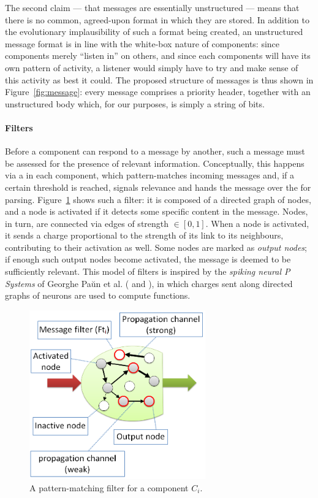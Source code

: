 The second claim --- that messages are essentially unstructured --- means that there is no common, agreed-upon format in which they are stored. In addition to the evolutionary implausibility of such a format being created, an unstructured message format is in line with the white-box nature of components: since components merely ``listen in'' on others, and since each components will have its own pattern of activity, a listener would simply have to try and make sense of this activity as best it could. The proposed structure of messages is thus shown in Figure~\ref{fig:message}: every message comprises a priority header, together with an unstructured body which, for our purposes, is simply a string of bits.

\paragraph{Filters} Before a component can respond to a message by another, such a message must be assessed for the presence of relevant information. Conceptually, this happens via a  in each component, which pattern-matches incoming messages and, if a certain threshold is reached, signals relevance and hands the message over the  for parsing. Figure~\ref{fig:filter} shows such a filter: it is composed of a directed graph of nodes, and a node is activated if it detects some specific content in the message. Nodes, in turn, are connected via edges of strength $\in [0,1]$. When a node is activated, it sends a charge proportional to the strength of its link to its neighbours, contributing to their activation as well. Some nodes are marked as {\em output nodes}; if enough such output nodes become activated, the message is deemed to be sufficiently relevant. This model of filters is inspired by the {\em spiking neural P Systems} of Georghe Pa\u{u}n et al. (\cite[p. 337]{membraneComputing} and \cite{spikingNeural}), in which charges sent along directed graphs of neurons are used to compute functions.

\begin{figure}[!h]
	\centering
	\includegraphics[width=215pt]{figs/filter.png}
	\caption{A pattern-matching filter for a component $C_i$.}
	\label{fig:filter}
\end{figure}